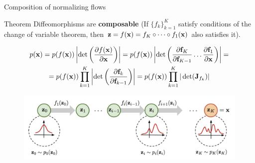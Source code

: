 \begin{frame}{Composition of normalizing flows}
	\begin{block}{Theorem}
		Diffeomorphisms are \textbf{composable} (If $\{f_k\}_{k=1}^K$ satisfy conditions of the change of variable theorem, then $\mathbf{z} = f(\mathbf{x}) = f_K \circ \dots \circ f_1(\mathbf{x})$ also satisfies it).
	\end{block}
	\vspace{-0.5cm}
	{ \footnotesize
		\begin{multline*}
			p(\mathbf{x}) = p(f(\mathbf{x})) \left|\det \left(\frac{\partial f(\mathbf{x})}{\partial \mathbf{x}} \right) \right| =
			p(f(\mathbf{x})) \left|\det \left(\frac{\partial \textbf{f}_K}{\partial \textbf{f}_{K-1}} \dots \frac{\partial \textbf{f}_1}{\partial \mathbf{x}} \right) \right| = \\ = p(f(\mathbf{x})) \prod_{k=1}^K \left|\det \left(\frac{\partial \textbf{f}_{k}}{\partial \textbf{f}_{k-1}} \right) \right|
			= p(f(\mathbf{x})) \prod_{k=1}^K |\det ( \mathbf{J}_{f_k}) |
		\end{multline*}
	}
	\vspace{-0.3cm}
	\begin{figure}
		\includegraphics[width=0.95\linewidth]{figs/normalizing-flow}
	\end{figure}
\end{frame}
